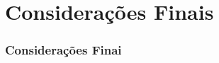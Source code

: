 \section{Considerações Finais}
\begin{frame}
\frametitle{Considerações Finai}
\label{consideracoes_finais}

\end{frame}